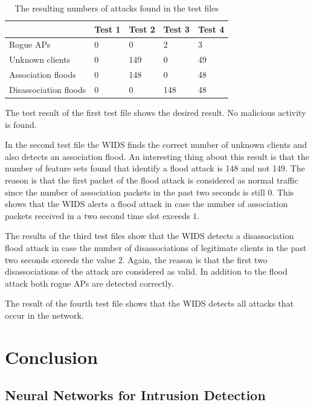 \begin{table}[htbp]
	\vspace{1.5em}
	\begin{center}
		\begin{tabular}{|l|l|l|l|l|}
		\hline
		&\bf{Test 1}&\bf{Test 2}&\bf{Test 3}&\bf{Test 4} \\
		\hline
		Rogue APs&0&0&2&3\\
		\hline
		Unknown clients&0&149&0&49\\
		\hline
		Association floods&0&148&0&48\\
		\hline
		Disassociation floods&0&0&148&48\\
		\hline
		\end{tabular}
	\end{center}
	\vspace{-1em}
	\caption{The resulting numbers of attacks found in the test files}
	\label{result_test}
\end{table}

The test result of the first test file shows the desired result. No malicious activity is found.

In the second test file the WIDS finds the correct number of unknown clients and also detects an association flood. An interesting thing about this result is that the number of feature sets found that identify a flood attack is 148 and not 149. The reason is that the first packet of the flood attack is considered as normal traffic since the number of association packets in the past two seconds is still $0$. This shows that the WIDS alerts a flood attack in case the number of association packets received in a two second time slot exceeds $1$.

The results of the third test files show that the WIDS detects a disassociation flood attack in case the number of disassociations of legitimate clients in the past two seconds exceeds the value $2$. Again, the reason is that the first two disassociations of the attack are considered as valid. In addition to the flood attack both rogue APs are detected correctly.

The result of the fourth test file shows that the WIDS detects all attacks that occur in the network.

\chapter{Conclusion}

\section{Neural Networks for Intrusion Detection}

